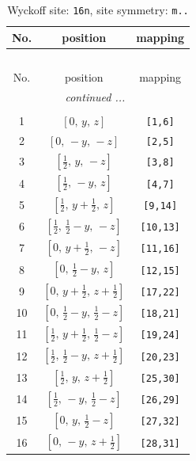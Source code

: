 \documentclass[fleqn,8pt]{jsarticle}
\begin{document}
\renewcommand{\arraystretch}{1.2}
\begin{longtable}{ccc}
\caption{Wyckoff site: {\tt 16n}, site symmetry: {\tt m..}}
 \\
 \hline \hline
No. & position & mapping \\ \hline \endfirsthead

\multicolumn{2}{l}{\tablename\ \thetable{}} \\
 \hline \hline
No. & position & mapping \\ \hline \endhead

 \hline \hline
\multicolumn{2}{r}{\footnotesize\it continued ...} \\ \endfoot

 \hline \hline
\multicolumn{2}{r}{} \\ \endlastfoot

1 & $\left[ 0,\, y,\, z \right]$ & {\tt [1,6]} \\ \hline
2 & $\left[ 0,\, - y,\, - z \right]$ & {\tt [2,5]} \\ \hline
3 & $\left[ \frac{1}{2},\, y,\, - z \right]$ & {\tt [3,8]} \\ \hline
4 & $\left[ \frac{1}{2},\, - y,\, z \right]$ & {\tt [4,7]} \\ \hline
5 & $\left[ \frac{1}{2},\, y + \frac{1}{2},\, z \right]$ & {\tt [9,14]} \\ \hline
6 & $\left[ \frac{1}{2},\, \frac{1}{2} - y,\, - z \right]$ & {\tt [10,13]} \\ \hline
7 & $\left[ 0,\, y + \frac{1}{2},\, - z \right]$ & {\tt [11,16]} \\ \hline
8 & $\left[ 0,\, \frac{1}{2} - y,\, z \right]$ & {\tt [12,15]} \\ \hline
9 & $\left[ 0,\, y + \frac{1}{2},\, z + \frac{1}{2} \right]$ & {\tt [17,22]} \\ \hline
10 & $\left[ 0,\, \frac{1}{2} - y,\, \frac{1}{2} - z \right]$ & {\tt [18,21]} \\ \hline
11 & $\left[ \frac{1}{2},\, y + \frac{1}{2},\, \frac{1}{2} - z \right]$ & {\tt [19,24]} \\ \hline
12 & $\left[ \frac{1}{2},\, \frac{1}{2} - y,\, z + \frac{1}{2} \right]$ & {\tt [20,23]} \\ \hline
13 & $\left[ \frac{1}{2},\, y,\, z + \frac{1}{2} \right]$ & {\tt [25,30]} \\ \hline
14 & $\left[ \frac{1}{2},\, - y,\, \frac{1}{2} - z \right]$ & {\tt [26,29]} \\ \hline
15 & $\left[ 0,\, y,\, \frac{1}{2} - z \right]$ & {\tt [27,32]} \\ \hline
16 & $\left[ 0,\, - y,\, z + \frac{1}{2} \right]$ & {\tt [28,31]} \\
\end{longtable}
\end{document}
